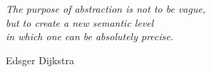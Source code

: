 \vspace{5mm}
\large
\noindent \phantom{xxxxxxxxxxxxxxxxx} \emph{The purpose of abstraction is not to be vague,} \\ 
\noindent \phantom{xxxxxxxxxxxxxxxxxxx} \emph{but to create a new semantic level} \\
\noindent \phantom{xxxxxxxxxxxxxxxxxxxxx} \emph{in which one can be absolutely precise.}

\vspace{0.5mm}
\noindent \phantom{ixxxxxxxxxxxxxxxcxxxxxxxxxxxxxxxxxxxxxxxxxx} \small{Edsger Dijkstra} 



